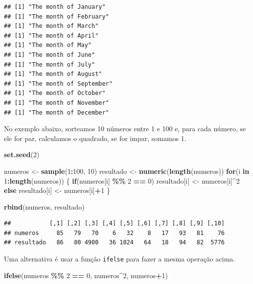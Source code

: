 \documentclass[
]{book}
\newenvironment{Shaded}{\begin{snugshade}}{\end{snugshade}}
\newcommand{\ControlFlowTok}[1]{\textcolor[rgb]{0.13,0.29,0.53}{\textbf{#1}}}
\newcommand{\DecValTok}[1]{\textcolor[rgb]{0.00,0.00,0.81}{#1}}
\newcommand{\FunctionTok}[1]{\textcolor[rgb]{0.13,0.29,0.53}{\textbf{#1}}}
\newcommand{\NormalTok}[1]{#1}
\newcommand{\OtherTok}[1]{\textcolor[rgb]{0.56,0.35,0.01}{#1}}
\newcommand{\SpecialCharTok}[1]{\textcolor[rgb]{0.81,0.36,0.00}{\textbf{#1}}}
\begin{document}
\begin{verbatim}
## [1] "The month of January"
## [1] "The month of February"
## [1] "The month of March"
## [1] "The month of April"
## [1] "The month of May"
## [1] "The month of June"
## [1] "The month of July"
## [1] "The month of August"
## [1] "The month of September"
## [1] "The month of October"
## [1] "The month of November"
## [1] "The month of December"
\end{verbatim}

No exemplo abaixo, sorteamos 10 números entre 1 e 100 e, para cada número, se ele for par, calculamos o quadrado, se for impar, somamos 1.

\begin{Shaded}
\begin{Highlighting}[]
\FunctionTok{set.seed}\NormalTok{(}\DecValTok{2}\NormalTok{)}

\NormalTok{numeros }\OtherTok{\textless{}{-}} \FunctionTok{sample}\NormalTok{(}\DecValTok{1}\SpecialCharTok{:}\DecValTok{100}\NormalTok{, }\DecValTok{10}\NormalTok{)}
\NormalTok{resultado }\OtherTok{\textless{}{-}} \FunctionTok{numeric}\NormalTok{(}\FunctionTok{length}\NormalTok{(numeros))}
\ControlFlowTok{for}\NormalTok{(i }\ControlFlowTok{in} \DecValTok{1}\SpecialCharTok{:}\FunctionTok{length}\NormalTok{(numeros)) \{}
  \ControlFlowTok{if}\NormalTok{(numeros[i] }\SpecialCharTok{\%\%} \DecValTok{2} \SpecialCharTok{==} \DecValTok{0}\NormalTok{)}
\NormalTok{    resultado[i] }\OtherTok{\textless{}{-}}\NormalTok{ numeros[i]}\SpecialCharTok{\^{}}\DecValTok{2}
  \ControlFlowTok{else}
\NormalTok{    resultado[i] }\OtherTok{\textless{}{-}}\NormalTok{ numeros[i]}\SpecialCharTok{+}\DecValTok{1}
\NormalTok{\}}

\FunctionTok{rbind}\NormalTok{(numeros, resultado)}
\end{Highlighting}
\end{Shaded}

\begin{verbatim}
##           [,1] [,2] [,3] [,4] [,5] [,6] [,7] [,8] [,9] [,10]
## numeros     85   79   70    6   32    8   17   93   81    76
## resultado   86   80 4900   36 1024   64   18   94   82  5776
\end{verbatim}

Uma alternativa é usar a função \texttt{ifelse} para fazer a mesma operação acima.

\begin{Shaded}
\begin{Highlighting}[]
\FunctionTok{ifelse}\NormalTok{(numeros }\SpecialCharTok{\%\%} \DecValTok{2} \SpecialCharTok{==} \DecValTok{0}\NormalTok{, numeros}\SpecialCharTok{\^{}}\DecValTok{2}\NormalTok{, numeros}\SpecialCharTok{+}\DecValTok{1}\NormalTok{)}
\end{Highlighting}
\end{Shaded}
\end{document}
